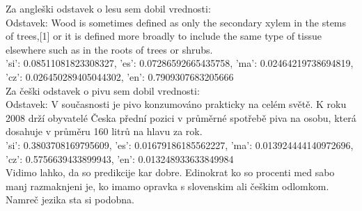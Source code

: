 \documentclass[a4paper,11pt]{article}
\begin{document}
Za angleški odstavek o lesu sem dobil vrednosti:
\\Odstavek: Wood is sometimes defined as only the secondary xylem in the stems of trees,[1] or it is defined more broadly to include the same type of tissue elsewhere such as in the roots of trees or shrubs.
\\{'si': 0.08511081823308327, 'es': 0.07286592665435758, 'ma': 0.02464219738694819, 'cz': 0.026450289405044302, 'en': 0.7909307683205666}
\\


Za češki odstavek o pivu sem dobil vrednosti:
\\Odstavek: V současnosti je pivo konzumováno prakticky na celém světě. K roku 2008 drží obyvatelé Česka přední pozici v průměrné spotřebě piva na osobu, která dosahuje v průměru 160 litrů na hlavu za rok.
\\
{'si': 0.3803708169795609, 'es': 0.01679186185562227, 'ma': 0.013924444140972696, 'cz': 0.5756639433899943, 'en': 0.013248933633849984}
\\

Vidimo lahko, da so predikcije kar dobre. Edinokrat ko so procenti med sabo manj razmaknjeni je, ko imamo opravka s slovenskim ali češkim odlomkom.
\\Namreč jezika sta si podobna.
\end{document}
